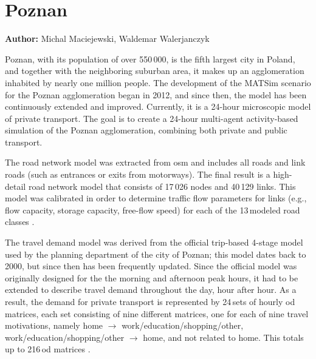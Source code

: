 \section{Poznan}
\label{sec:poznan}
\hfill \textbf{Author:} Michal Maciejewski, Waldemar Walerjanczyk



Poznan, with its population of over 550\,000, is the fifth largest city in Poland, and together with the neighboring suburban area, it makes up an agglomeration inhabited by nearly one million people. The development of the MATSim scenario for the Poznan agglomeration began in 2012, and since then, the model has been continuously extended and improved. Currently, it is a 24-hour microscopic model of private transport. The goal is to create a 24-hour multi-agent activity-based simulation of the Poznan agglomeration, combining both private and public transport.

The road network model was extracted from \gls{osm} and includes all roads and link roads (such as entrances or exits from motorways). The final result is a high-detail road network model that consists of 17\,026 nodes and 40\,129 links. This model was calibrated in order to determine traffic flow parameters for links (e.g.,\,flow capacity, storage capacity, free-flow speed) for each of the 13\,modeled road classes \citep{PiatkowskiMaciejewski2012osmNetwork}.

The travel demand model was derived from the official trip-based 4-stage model used by the planning department of the city of Poznan; this model dates back to 2000, but since then has been frequently updated. Since the official model was originally designed for the the morning and afternoon peak hours, it had to be extended to describe travel demand throughout the day, hour after hour. As a result, the demand for private transport is represented by 24\,sets of hourly \gls{od} matrices, each set consisting of nine different matrices, one for each of nine travel motivations, namely home $\rightarrow$ work/education/shopping/other, work/education/shopping/other $\rightarrow$ home, and not related to home. This totals up to 216\,\gls{od} matrices \citep{PiatkowskiEtAl2013Poznan24hSimulation, MaciejewskiEtAl2014MikroMakro}.

